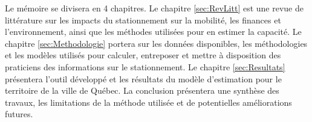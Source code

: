 Le mémoire se divisera en 4 chapitres. Le chapitre \ref{sec:RevLitt} est une revue de littérature sur les impacts du stationnement sur la mobilité, les finances et l'environnement, ainsi que les méthodes utilisées pour en estimer la capacité. Le chapitre \ref{sec:Methodologie} portera sur les données disponibles, les méthodologies et les modèles utilisés pour calculer, entreposer et mettre à disposition des praticiens des informations sur le stationnement. Le chapitre \ref{sec:Resultats} présentera l'outil développé et les résultats du modèle d'estimation pour le territoire de la ville de Québec. La conclusion présentera une synthèse des travaux, les limitations de la méthode utilisée et de potentielles améliorations futures.

\clearpage
